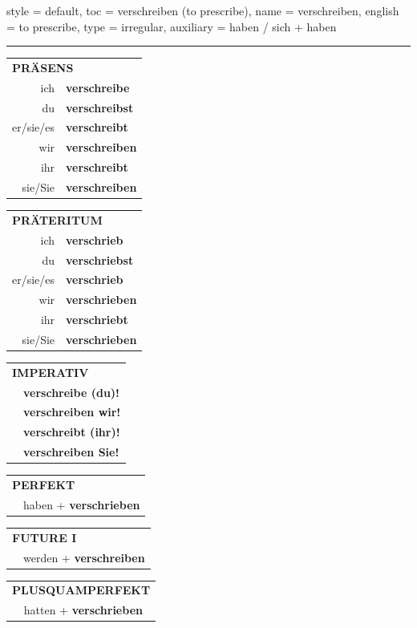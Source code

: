 \begin{verbentry}{
  style = {default},
  toc = {verschreiben (to prescribe)},
  name = {verschreiben},
  english = {to prescribe},
  type = {irregular},
  auxiliary = {haben / sich + haben}
}


\vspace{5pt}
\hrule
\vspace{5pt}

\begin{tabular}{rl}
\multicolumn{2}{l}{\textbf{PRÄSENS}}\\
ich & \textbf{verschreibe}\\
du & \textbf{verschreibst}\\
er/sie/es & \textbf{verschreibt}\\
wir & \textbf{verschreiben}\\
ihr & \textbf{verschreibt}\\
sie/Sie & \textbf{verschreiben}\\
\end{tabular}
\hfill
\begin{tabular}{rl}
\multicolumn{2}{l}{\textbf{PRÄTERITUM}}\\
ich & \textbf{verschrieb}\\
du & \textbf{verschriebst}\\
er/sie/es & \textbf{verschrieb}\\
wir & \textbf{verschrieben}\\
ihr & \textbf{verschriebt}\\
sie/Sie & \textbf{verschrieben}\\
\end{tabular}
\hfill
\begin{tabular}{rl}
\multicolumn{2}{l}{\textbf{IMPERATIV}}\\
& \textbf{verschreibe (du)!}\\
& \textbf{verschreiben wir!}\\
& \textbf{verschreibt (ihr)!}\\
& \textbf{verschreiben Sie!}\\
\end{tabular}

\vspace{10pt}

\begin{tabular}{rl}
\multicolumn{2}{l}{\textbf{PERFEKT}}\\
& haben + \textbf{verschrieben}\\
\end{tabular}
\hfill
\begin{tabular}{rl}
\multicolumn{2}{l}{\textbf{FUTURE I}}\\
& werden + \textbf{verschreiben}\\
\end{tabular}
\hfill
\begin{tabular}{rl}
\multicolumn{2}{l}{\textbf{PLUSQUAMPERFEKT}}\\
& hatten + \textbf{verschrieben}\\
\end{tabular}


\end{verbentry}
